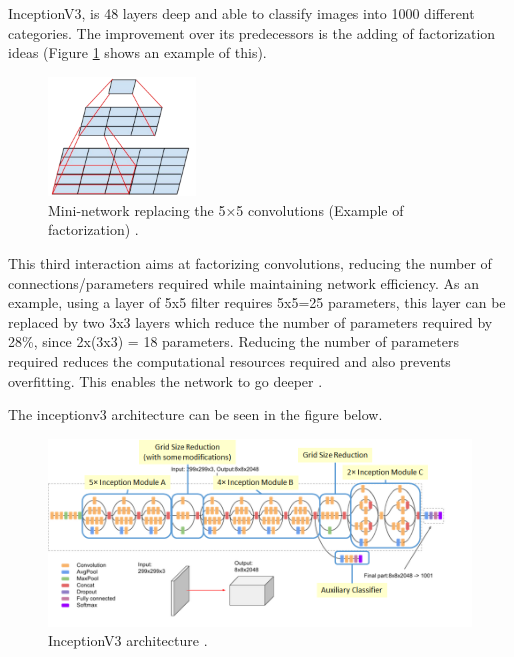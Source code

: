     InceptionV3, is 48 layers deep and able to classify images into 1000 different categories. The improvement over its predecessors is the adding of factorization ideas (Figure \ref{fig:factorization} shows an example of this). 

    \begin{figure}[H]
        \centering
        \captionsetup{justification=centering}
        \includegraphics[width=0.35\textwidth]{Sections/2StateOfTheArt/2_images/factor_inception.png}
        \caption[Example of factorization.]{Mini-network replacing the 5×5 convolutions (Example of factorization) \cite{Szegedy2016}.} 
        \label{fig:factorization}
    \end{figure}


    \par This third interaction aims at factorizing convolutions, reducing the number of connections/parameters required while maintaining network efficiency. As an example, using a layer of 5x5 filter requires 5x5=25 parameters, this layer can be replaced by two 3x3 layers which reduce the number of parameters required by 28\%, since 2x(3x3) = 18 parameters. Reducing the number of parameters required reduces the computational resources required and also prevents overfitting. This enables the network to go deeper \cite{inceptionV3web}.
    \par The inceptionv3 architecture can be seen in the figure below.
  
    \begin{figure}[H]
        \centering
        \captionsetup{justification=centering}
        \includegraphics[width=\textwidth]{Sections/2StateOfTheArt/2_images/inceptionv3_architecture.png}
        \caption[InceptionV3 architecture]{InceptionV3 architecture \cite{inceptionV3web}.} 
    \end{figure}

